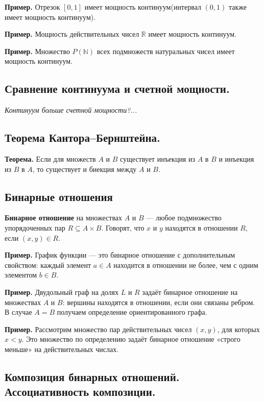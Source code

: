 \documentclass[a4paper, 10pt]{article}
\begin{document}
\textbf{Пример.} Отрезок $[0, 1]$ имеет мощность континуум(интервал $(0, 1)$ также имеет мощность континуум).

\textbf{Пример.} Мощность действительных чисел $\mathbb{R}$ имеет мощность континуум.

\textbf{Пример.} Множество $P(\mathbb{N})$ всех подмножеств натуральных чисел имеет мощность континуум.


\subsection{Сравнение континуума и счетной мощности.}

\textit{Континуум больше счетной мощности?...}


\subsection{Теорема Кантора–Бернштейна.}

\textbf{Теорема.} Если для множеств $A$ и $B$ существует инъекция из $A$ в $B$ и инъекция из $B$ в $A$, то существует и биекция между $A$ и $B$.


\subsection{Бинарные отношения}

\textbf{Бинарное отношение} на множествах $A$ и $B$ --- любое подмножество упорядоченных пар $R \subseteq A \times B$. Говорят, что $x$ и $y$ находятся в отношении $R$, если $(x,y) \in R$.

\textbf{Пример.} График функции --- это бинарное отношение с дополнительным свойством: каждый элемент $a \in A$ находится в отношении не более, чем с одним элементом $b \in B$.

\textbf{Пример.} Двудольный граф на долях $L$ и $R$ задаёт бинарное отношение на множествах $A$ и $B$: вершины находятся в отношении, если они связаны ребром. В случае $A = B$ получаем определение ориентированного графа.

\textbf{Пример.} Рассмотрим множество пар действительных чисел $(x, y)$, для которых $x < y$. Это множество по определению задаёт бинарное отношение «строго меньше» на действительных числах.

\subsection{Композиция бинарных отношений. Ассоциативность композиции.}
\end{document}
